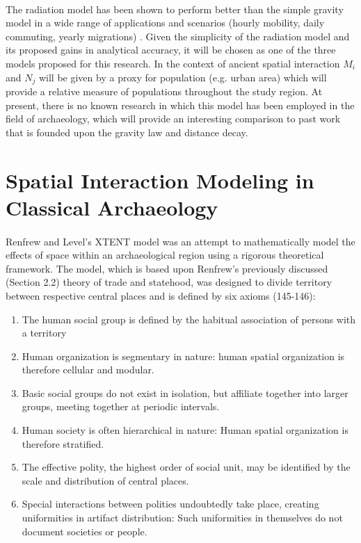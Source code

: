 \documentclass[12pt,a4paper]{thesis}
\begin{document}
\paragraph{}	
The radiation model has been shown to perform better than the simple gravity model in a wide range of applications and scenarios (hourly mobility, daily commuting, yearly migrations) \citep[4-5, Figure 3]{Bar12}. Given the simplicity of the radiation model and its proposed gains in analytical accuracy, it will be chosen as one of the three models proposed for this research. In the context of ancient spatial interaction $M_{i}$ and $N_{j}$ will be given by a proxy for population (e.g. urban area) which will provide a relative measure of populations throughout the study region. At present, there is no known research in which this model has been employed in the field of archaeology, which will provide an interesting comparison to past work that is founded upon the gravity law and distance decay.

\section{Spatial Interaction Modeling in Classical Archaeology}

\paragraph{}	
Renfrew and Level's XTENT model \citeyearpar{RenLev79} was an attempt to mathematically model the effects of space within an archaeological region using a rigorous theoretical framework. The model, which is based upon Renfrew's previously discussed (Section 2.2)  theory of trade and statehood, was designed to divide territory between respective central places and is defined by six  axioms (145-146):

	
\begin{enumerate}
\item The human social group is defined by the habitual association of persons with a territory
\item Human organization is segmentary in nature: human spatial organization is therefore cellular and modular.
\item Basic social groups do not exist in isolation, but affiliate together into larger groups, meeting together at periodic intervals. 
\item Human society is often hierarchical in nature: Human spatial organization is therefore 	stratified.
\item The effective polity, the highest order of social unit, may be identified by the scale and 	distribution of central places.
\item Special interactions between polities undoubtedly take place, creating uniformities in 	artifact distribution: Such uniformities in themselves do not document societies or people.
\end{enumerate}
\end{document}
